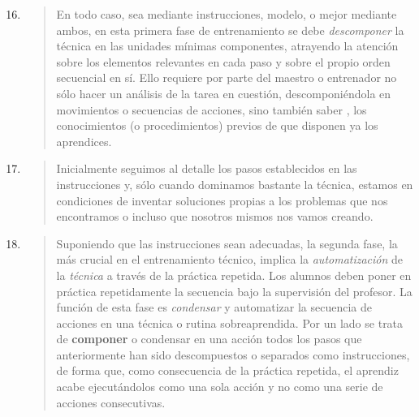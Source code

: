 \documentclass{article}
\begin{document}
\begin{enumerate}
  \setcounter{enumi}{15}

  \item \begin{quote}
  En todo caso, sea mediante instrucciones, modelo, o mejor mediante ambos, en esta primera fase de entrenamiento se debe \textit{descomponer} la técnica en las unidades mínimas componentes, atrayendo la atención sobre los elementos relevantes en cada paso y sobre el propio orden secuencial en sí. Ello requiere por parte del maestro o entrenador no sólo hacer un análisis de la tarea en cuestión, descomponiéndola en movimientos o secuencias de acciones, sino también saber , los conocimientos (o procedimientos) previos de que disponen ya los aprendices.
  \end{quote}

  \item \begin{quote}
  Inicialmente seguimos al detalle los pasos establecidos en las instrucciones y, sólo cuando dominamos bastante la técnica, estamos en condiciones de inventar soluciones propias a los problemas que nos encontramos o incluso que nosotros mismos nos vamos creando.
  \end{quote}

  \item \begin{quote}
  Suponiendo que las instrucciones sean adecuadas, la segunda fase, la más crucial en el entrenamiento técnico, implica la \textit{automatización} de la \textit{técnica} a través de la práctica repetida. Los alumnos deben poner en práctica repetidamente la secuencia bajo la supervisión del profesor. La función de esta fase es \textit{condensar} y automatizar la secuencia de acciones en una técnica o rutina sobreaprendida. Por un lado se trata de \textbf{componer} o condensar en una acción todos los pasos que anteriormente han sido descompuestos o separados como instrucciones, de forma que, como consecuencia de la práctica repetida, el aprendiz acabe ejecutándolos como una sola acción y no como una serie de acciones consecutivas.
  \end{quote}


\end{enumerate}
\end{document}
